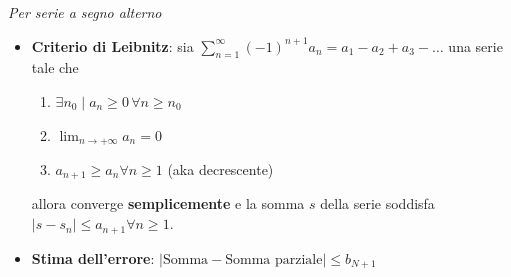 \documentclass[12pt, a4paper]{article}
\begin{document}
        \textit{Per serie a segno alterno}
        \begin{itemize}
            \item \textbf{Criterio di Leibnitz}: sia $\sum_{n=1}^{\infty}(-1)^{n+1}a_n = a_1-a_2+a_3-\ldots$ una serie tale che
                \begin{enumerate}
                    \item $\exists n_0\mid a_n\geq 0\,\forall n\geq n_0$
                    \item $\lim_{n\rightarrow+\infty}a_n=0$
                    \item $a_{n+1}\geq a_n \forall n\geq 1$ (aka decrescente)
                \end{enumerate}
                allora converge \textbf{semplicemente} e la somma $s$ della serie soddisfa $\left|s-s_n\right|\leq a_{n+1}\forall n\geq 1$.
            \item \textbf{Stima dell'errore}: $\left|\text{Somma} - \text{Somma parziale}\right|\leq b_{N+1}$
        \end{itemize}
    \newpage
\end{document}

